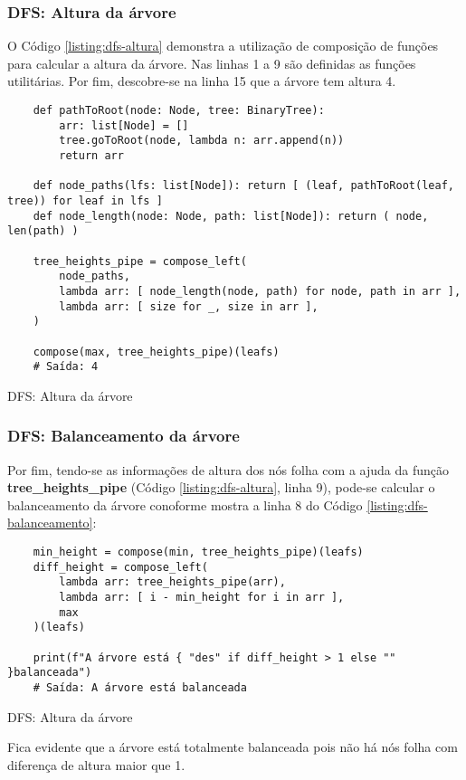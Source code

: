 \subsubsection{DFS: Altura da árvore}

O Código \ref{listing:dfs-altura} demonstra a utilização de composição de funções para calcular a altura da
árvore. Nas linhas 1 a 9 são definidas as funções utilitárias. Por fim, descobre-se na linha 15 que a árvore
tem altura 4.
\vfill
\pagebreak

\begin{listing}[H]
    \begin{verbatim}
    def pathToRoot(node: Node, tree: BinaryTree):
        arr: list[Node] = []
        tree.goToRoot(node, lambda n: arr.append(n))
        return arr

    def node_paths(lfs: list[Node]): return [ (leaf, pathToRoot(leaf, tree)) for leaf in lfs ]
    def node_length(node: Node, path: list[Node]): return ( node, len(path) )

    tree_heights_pipe = compose_left(
        node_paths,
        lambda arr: [ node_length(node, path) for node, path in arr ],
        lambda arr: [ size for _, size in arr ],
    )

    compose(max, tree_heights_pipe)(leafs)
    # Saída: 4
    \end{verbatim}
    \caption{DFS: Altura da árvore}
    \label{listing:dfs-altura}
\end{listing}

\subsubsection{DFS: Balanceamento da árvore}

Por fim, tendo-se as informações de altura dos nós folha com a ajuda da função \textbf{tree\_heights\_pipe} (Código \ref{listing:dfs-altura}, linha 9),
pode-se calcular o balanceamento da árvore conoforme mostra a linha 8 do Código \ref{listing:dfs-balanceamento}:

\begin{listing}[H]
    \begin{verbatim}
    min_height = compose(min, tree_heights_pipe)(leafs)
    diff_height = compose_left(
        lambda arr: tree_heights_pipe(arr),
        lambda arr: [ i - min_height for i in arr ],
        max
    )(leafs)

    print(f"A árvore está { "des" if diff_height > 1 else "" }balanceada")
    # Saída: A árvore está balanceada
    \end{verbatim}
    \caption{DFS: Altura da árvore}
    \label{listing:dfs-balanceamento}
\end{listing}

Fica evidente que a árvore está totalmente balanceada pois não há nós folha com diferença de altura maior que 1.

